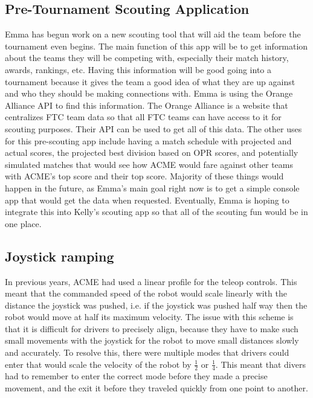 \documentclass{article}
\begin{document}
\subsection{Pre-Tournament Scouting Application}
Emma has begun work on a new scouting tool that will aid the team before the tournament even begins. The main function of this app will be to get information about the teams they will be competing with, especially their match history, awards, rankings, etc. Having this information will be good going into a tournament because it gives the team a good idea of what they are up against and who they should be making connections with. Emma is using the Orange Alliance API to find this information. The Orange Alliance is a website that centralizes FTC team data so that all FTC teams can have access to it for scouting purposes. Their API can be used to get all of this data. The other uses for this pre-scouting app include having a match schedule with projected and actual scores, the projected best division based on OPR scores, and potentially simulated matches that would see how ACME would fare against other teams with ACME's top score and their top score. Majority of these things would happen in the future, as Emma's main goal right now is to get a simple console app that would get the data when requested. Eventually, Emma is hoping to integrate this into Kelly's scouting app so that all of the scouting fun would be in one place. 

\subsection{Joystick ramping}
In previous years, ACME had used a linear profile for the teleop controls. This meant that the commanded speed of the robot would scale linearly with the distance the joystick was pushed, i.e. if the joystick was pushed half way then the robot would move at half its maximum velocity. The issue with this scheme is that it is difficult for drivers to precisely align, because they have to make such small movements with the joystick for the robot to move small distances slowly and accurately. To resolve this, there were multiple modes that drivers could enter that would scale the velocity of the robot by $\frac{1}{2}$ or $\frac{1}{4}$. This meant that divers had to remember to enter the correct mode before they made a precise movement, and the exit it before they traveled quickly from one point to another. 
\end{document}

